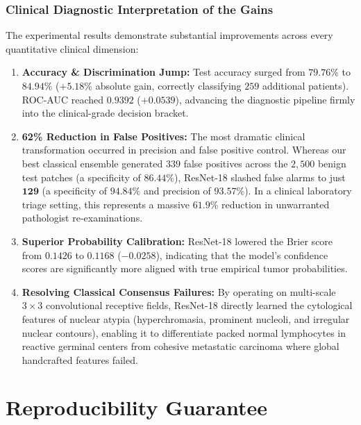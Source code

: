 \documentclass[11pt,a4paper]{article}
\begin{document}
\subsubsection{Clinical Diagnostic Interpretation of the Gains}
The experimental results demonstrate substantial improvements across every quantitative clinical dimension:
\begin{enumerate}[leftmargin=*]
    \item \textbf{Accuracy \& Discrimination Jump:} Test accuracy surged from $79.76\%$ to $\mathbf{84.94\%}$ ($+5.18\%$ absolute gain, correctly classifying $259$ additional patients). ROC-AUC reached $\mathbf{0.9392}$ ($+0.0539$), advancing the diagnostic pipeline firmly into the clinical-grade decision bracket.
    \item \textbf{62\% Reduction in False Positives:} The most dramatic clinical transformation occurred in precision and false positive control. Whereas our best classical ensemble generated $339$ false positives across the $2,500$ benign test patches (a specificity of $86.44\%$), ResNet-18 slashed false alarms to just $\mathbf{129}$ (a specificity of $\mathbf{94.84\%}$ and precision of $\mathbf{93.57\%}$). In a clinical laboratory triage setting, this represents a massive $61.9\%$ reduction in unwarranted pathologist re-examinations.
    \item \textbf{Superior Probability Calibration:} ResNet-18 lowered the Brier score from $0.1426$ to $\mathbf{0.1168}$ ($-0.0258$), indicating that the model's confidence scores are significantly more aligned with true empirical tumor probabilities.
    \item \textbf{Resolving Classical Consensus Failures:} By operating on multi-scale $3 \times 3$ convolutional receptive fields, ResNet-18 directly learned the cytological features of nuclear atypia (hyperchromasia, prominent nucleoli, and irregular nuclear contours), enabling it to differentiate packed normal lymphocytes in reactive germinal centers from cohesive metastatic carcinoma where global handcrafted features failed.
\end{enumerate}


\section{Reproducibility Guarantee}
\end{document}
